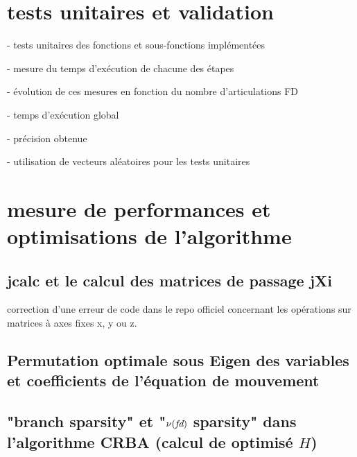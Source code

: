 \documentclass{report}
\begin{document}
\section{tests unitaires et validation}




- tests unitaires des fonctions et sous-fonctions implémentées

- mesure du temps d'exécution de chacune des étapes

- évolution de ces mesures en fonction du nombre d'articulations FD

- temps d'exécution global

- précision obtenue

- utilisation de vecteurs aléatoires pour les tests unitaires


\section{mesure de performances et optimisations de l'algorithme} \label{ch_impl_optimisation}


\subsection{jcalc et le calcul des matrices de passage jXi}
correction d'une erreur de code dans le repo officiel concernant les opérations sur matrices à axes fixes x, y ou z.

\subsection{Permutation optimale sous Eigen des variables et coefficients de l'équation de mouvement}


\subsection{"branch sparsity" et "$\nu(\emph{fd})$ sparsity" dans l'algorithme CRBA (calcul de optimisé $H$)}
\end{document}
